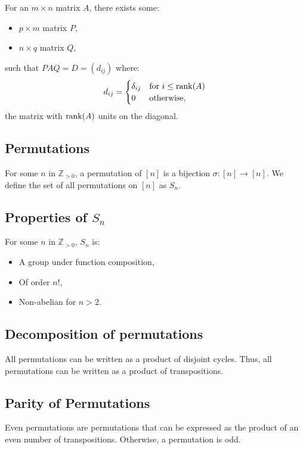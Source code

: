 For an $m \times n$ matrix $A$, there exists some: \begin{itemize}
    \item $p \times m$ matrix $P$,
    \item $n \times q$ matrix $Q$,
\end{itemize} such that $PAQ = D = (d_{ij})$ where: \begin{gather*}
    d_{ij} = \begin{cases}
        \delta_{ij} & \text{for } i \leq \operatorname{rank}(A) \\
        0           & \text{otherwise,}
    \end{cases}
\end{gather*} the matrix with $\operatorname{rank}(A)$ units on the diagonal.

\subsection{Permutations}

For some $n$ in $\mathbb{Z}_{> 0}$, a permutation of $[n]$ is a bijection
$\sigma : [n] \to [n]$. We define the set of all permutations on $[n]$ as
$S_n$.

\subsection{Properties of $S_n$}

For some $n$ in $\mathbb{Z}_{> 0}$, $S_n$ is: \begin{itemize}
    \item A group under function composition,
    \item Of order $n!$,
    \item Non-abelian for $n > 2$.
\end{itemize}

\subsection{Decomposition of permutations}

All permutations can be written as a product of disjoint cycles. Thus,
all permutations can be written as a product of transpositions.

\subsection{Parity of Permutations}

Even permutations are permutations that can be expressed as the
product of an even number of transpositions. Otherwise, a
permutation is odd. 

